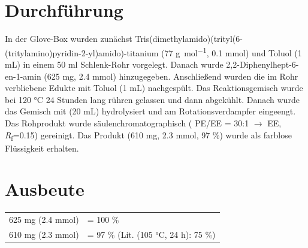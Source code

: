 \documentclass[12pt]{article}
\begin{document}
\begin{onehalfspace}
\section{Durchführung \cite{vor}}
In der Glove-Box wurden zunächst Tris(dimethylamido)(trityl(6-(tritylamino)pyridin-2-yl)amido)-titanium (77 \si{\gram\per\mol}, 0.1 \si{\milli\mol}) und Toluol (1 \si{\milli\liter}) in einem 50 ml Schlenk-Rohr vorgelegt. Danach wurde 2,2-Diphenylhept-6-en-1-amin (625 \si{\milli\gram}, 2.4 \si{\milli\mol}) hinzugegeben. Anschließend wurden die im Rohr verbliebene Edukte mit Toluol (1 \si{\milli\liter}) nachgespült. Das Reaktionsgemisch wurde bei 120 \si{\celsius} 24 Stunden lang rühren gelassen und dann abgekühlt. Danach wurde das Gemisch mit  (20 \si{\milli\liter}) hydrolysiert und am Rotationsverdampfer eingeengt. Das Rohprodukt wurde säulenchromatographisch ( PE/EE = 30:1 $\rightarrow$ EE, \textit{R}\textsubscript{f}=0.15) gereinigt. Das Produkt (610 \si{\milli\gram}, 2.3 \si{\milli\mol}, 97 \%) wurde als farblose Flüssigkeit erhalten.
\section{Ausbeute}
\begin{tabular}{ ll}
  625 \si{\milli\gram} (2.4 \si{\milli\mol})   & = 100 \%\\
  610 \si{\milli\gram} (2.3 \si{\milli\mol})   & = 97 \% (Lit.\cite{vor} (105 \si{\celsius}, 24 h): 75 \%) \\
 \end{tabular}


\end{onehalfspace}
\end{document}
